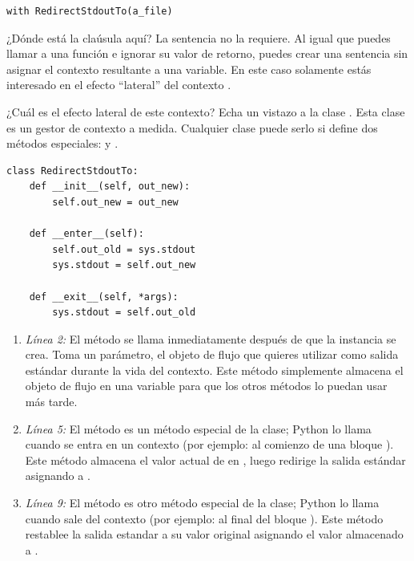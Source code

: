 \noindent\begin{minipage}{\textwidth}
\begin{lstlisting}[mathescape=True]
with RedirectStdoutTo(a_file)
\end{lstlisting}
\end{minipage}

¿Dónde está la claúsula  aquí? La sentencia  no la requiere. Al igual que puedes llamar a una función e ignorar su valor de retorno, puedes crear una sentencia  sin asignar el contexto resultante a una variable. En este caso solamente estás interesado en el efecto ``lateral'' del contexto .

¿Cuál es el efecto lateral de este contexto? Echa un vistazo a la clase . Esta clase es un gestor de contexto a medida. Cualquier clase puede serlo si define dos métodos especiales:  y .

\noindent\begin{minipage}{\textwidth}
\begin{lstlisting}[mathescape=True]
class RedirectStdoutTo:
    def __init__(self, out_new):
        self.out_new = out_new

    def __enter__(self):
        self.out_old = sys.stdout
        sys.stdout = self.out_new

    def __exit__(self, *args):
        sys.stdout = self.out_old
\end{lstlisting}
\end{minipage}

\begin{enumerate}

\item \emph{Línea 2:} El método  se llama inmediatamente después de que la instancia se crea. Toma un parámetro, el objeto de flujo que quieres utilizar como salida estándar durante la vida del contexto. Este método simplemente almacena el objeto de flujo en una variable para que los otros métodos lo puedan usar más tarde.

\item \emph{Línea 5:} El método  es un método especial de la clase; Python lo llama cuando se entra en un contexto (por ejemplo: al comienzo de una bloque ). Este método almacena el valor actual de  en , luego redirige la salida estándar asignando  a .

\item \emph{Línea 9:} El método  es otro método especial de la clase; Python lo llama cuando sale del contexto (por ejemplo: al final del bloque ). Este método restablee la salida estandar a su valor original asignando el valor almacenado  a .

\end{enumerate}

